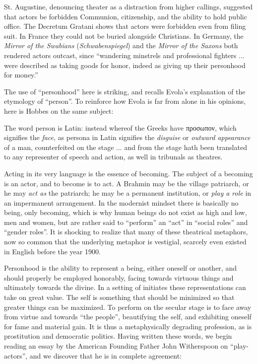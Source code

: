 St. Augustine, denouncing theater as a distraction from higher callings, suggested that actors be forbidden Communion, citizenship, and the ability to hold public office. The Decretum Gratani shows that actors were forbidden even from filing suit. In France they could not be buried alongside Christians. In Germany, the \emph{Mirror of the Swabians} (\emph{Schwabenspiegel}) and the \emph{Mirror of the Saxons} both rendered actors outcast, since ``wandering minstrels and professional fighters ... were described as taking goods for honor, indeed as giving up their personhood for money.''

The use of ``personhood'' here is striking, and recalls Evola's explanation of the etymology of ``person''. To reinforce how Evola is far from alone in his opinions, here is Hobbes on the same subject:

\begin{quotex}
The word person is Latin: instead whereof the Greeks have \textgreek{προσωπον}, which signifies the \emph{face}, as persona in Latin signifies the \emph{disguise} or \emph{outward appearance} of a man, counterfeited on the stage ... and from the stage hath been translated to any representer of speech and action, as well in tribunals as theatres.
\end{quotex}


Acting in its very language is the essence of becoming. The subject of a becoming is an actor, and to become is to act. A Brahmin may be the village patriarch, or he may \emph{act as} the patriarch; he may be a permanent institution, or \emph{play a role} in an impermanent arrangement. In the modernist mindset there is basically no being, only becoming, which is why human beings do not exist as high and low, men and women, but are rather said to ``perform'' an ``act'' in ``social roles'' and ``gender roles''. It is shocking to realize that many of these theatrical metaphors, now so common that the underlying metaphor is vestigial, scarcely even existed in English before the year 1900.

Personhood is the ability to represent a being, either oneself or another, and should properly be employed honorably, facing towards virtuous things and ultimately towards the divine. In a setting of initiates these representations can take on great value. The self is something that should be minimized so that greater things can be maximized. To perform on the secular stage is to face away from virtue and towards ``the people'', beautifying the self, and exhibiting oneself for fame and material gain. It is thus a metaphysically degrading profession, as is prostitution and democratic politics. Having written these words, we begin reading an essay by the American Founding Father John Witherspoon on ``play-actors'', and we discover that he is in complete agreement:

